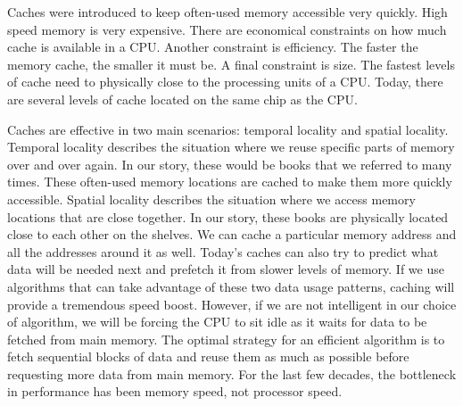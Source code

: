 Caches were introduced to keep often-used memory accessible very quickly.  High speed memory is very expensive.
There are economical constraints on how much cache is available in a CPU.
Another constraint is efficiency.  The faster the memory cache, the smaller it must be.
A final constraint is size.  The fastest levels of cache need to physically close to the processing units of a CPU.
Today, there are several levels of cache located on the same chip as the CPU.

Caches are effective in two main scenarios: temporal locality and spatial locality.
Temporal locality describes the situation where we reuse specific parts of memory over and over again.
In our story, these would be books that we referred to many times.
These often-used memory locations are cached to make them more quickly accessible.
Spatial locality describes the situation where we access memory locations that are close together.
In our story, these books are physically located close to each other on the shelves.
We can cache a particular memory address and all the addresses around it as well.
Today's caches can also try to predict what data will be needed next and prefetch it from slower levels of memory.
If we use algorithms that can take advantage of these two data usage patterns, caching will provide a tremendous speed boost.
However, if we are not intelligent in our choice of algorithm, we will be forcing the CPU to sit idle as it waits for data to be fetched from main memory.
The optimal strategy for an efficient algorithm is to fetch sequential blocks of data and reuse them as much as possible before requesting more data from main memory.
For the last few decades, the bottleneck in performance has been memory speed, not processor speed.

